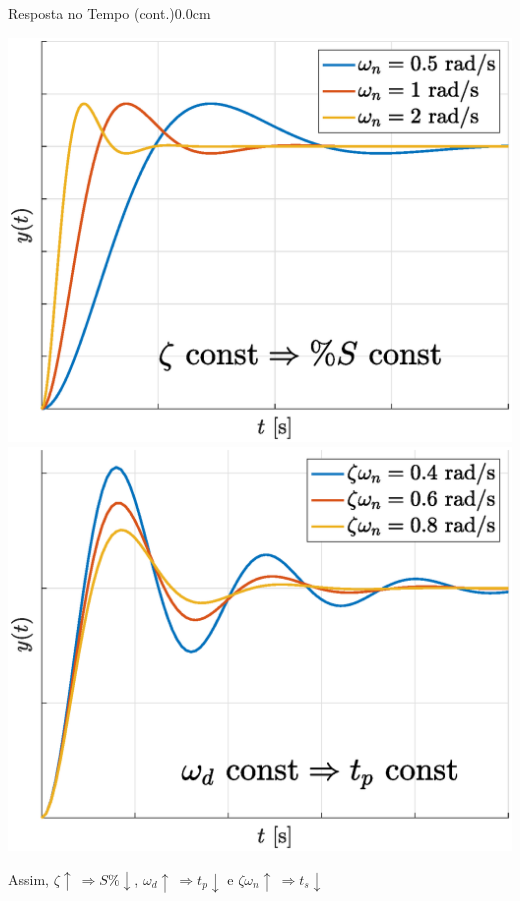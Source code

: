 \documentclass[portuguese,10pt,3col]{cheatsheet}
\begin{document}
\begin{multicols}{3}
\begin{cheatsheetbox}{Resposta no Tempo (cont.)}{0.0cm}
\begin{minipage}{.35\textwidth}
    \end{minipage}%
    \begin{minipage}{.16\textwidth}
        \centering
        \scalebox{0.5}{}
        \scalebox{0.5}{}
    \end{minipage}%
    \begin{minipage}{.34\textwidth}
        \centering
        \includegraphics[scale = 0.15]{figs/3.eps}
        \includegraphics[scale = 0.15]{figs/5.eps}
    \end{minipage}
    
    Assim, $\zeta \uparrow \ \Rightarrow S\% \downarrow$, $\omega_d \uparrow \ \Rightarrow t_p \downarrow$ e $\zeta\omega_n \uparrow \ \Rightarrow t_s \downarrow$\\
    

\end{cheatsheetbox}
\end{multicols}
\end{document}
